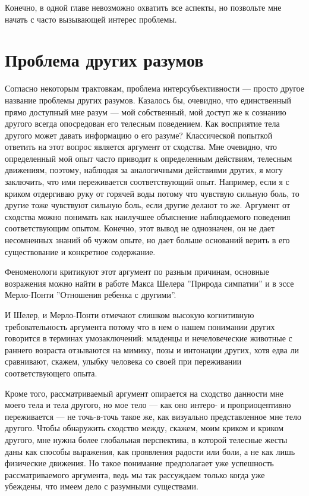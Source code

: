 \documentclass[11pt]{book}
\begin{document}
Конечно, в одной главе невозможно охватить все аспекты, но позвольте мне начать с часто вызывающей интерес проблемы.

\section{Проблема других разумов}

Согласно некоторым трактовкам, проблема интерсубъективности --- просто другое название проблемы других разумов. Казалось бы, очевидно, что единственный прямо доступный мне разум --- мой собственный, мой доступ же к сознанию другого всегда опосредован его телесным поведением. Как восприятие тела другого может давать информацию о его разуме? Классической попыткой ответить на этот вопрос является аргумент от сходства. Мне очевидно, что определенный мой опыт часто приводит к определенным действиям, телесным движениям, поэтому, наблюдая за аналогичными действиями других, я могу заключить, что ими переживается соответствующий опыт. Например, если я с криком отдергиваю руку от горячей воды потому что чувствую сильную боль, то другие тоже чувствуют сильную боль, если другие делают то же. Аргумент от сходства можно понимать как наилучшее объяснение наблюдаемого поведения соответствующим опытом. Конечно, этот вывод не однозначен, он не дает несомненных знаний об чужом опыте, но дает больше оснований верить в его существование и конкретное содержание.

Феноменологи критикуют этот аргумент по разным причинам, основные возражения можно найти в работе Макса Шелера ''Природа симпатии'' и в эссе Мерло-Понти ''Отношения ребенка с другими''.

И Шелер, и Мерло-Понти отмечают слишком высокую когнитивную требовательность аргумента потому что в нем о нашем понимании других говорится в терминах умозаключений: младенцы и нечеловеческие животные с раннего возраста отзываются на мимику, позы и интонации других, хотя едва ли сравнивают, скажем, улыбку человека со своей при переживании соответствующего опыта.

Кроме того, рассматриваемый аргумент опирается на сходство данности мне моего тела и тела другого, но мое тело --- как оно интеро- и проприоцептивно переживается --- не точь-в-точь такое же, как визуально представленное мне тело другого. Чтобы обнаружить сходство между, скажем, моим криком и криком другого, мне нужна более глобальная перспектива, в которой телесные жесты даны как способы выражения, как проявления радости или боли, а не как лишь физические движения. Но такое понимание предполагает уже успешность рассматриваемого аргумента, ведь мы так рассуждаем только когда уже убеждены, что имеем дело с разумными существами.
\end{document}
